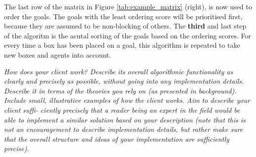 The last row of the matrix in Figure \ref{tab:example_matrix} (right), is now used to order the goals. The goals with the least ordering score will be prioritised first, because they are assumed to be non-blocking of others. The \textbf{third} and last step of the algoritm is the acutal sorting of the goals based on the ordering scores. For every time a box has been placed on a goal, this algorithm is repeated to take new boxes and agents into account. 

\emph{How does your client work? Describe its overall algorithmic functionality as clearly and precisely as possible, without going into any implementation details.  Describe it in terms of the theories you rely on (as presented in background). Include small, illustrative examples of how the client works. Aim to describe your client suffi- ciently precisely that a reader being an expert in the field would be able to implement a similar solution based on your description (note that this is not an encouragement to describe implementation details, but rather make sure that the overall structure and ideas of your implementation are sufficiently precise).}





